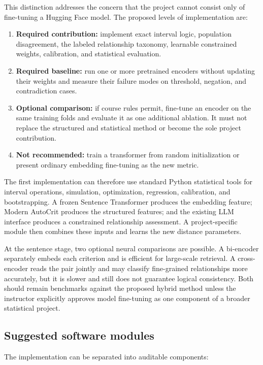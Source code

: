\documentclass[11pt]{article}
\begin{document}
This distinction addresses the concern that the project cannot consist only of fine-tuning a Hugging Face model. The proposed levels of implementation are:

\begin{enumerate}
    \item \textbf{Required contribution:} implement exact interval logic, population disagreement, the labeled relationship taxonomy, learnable constrained weights, calibration, and statistical evaluation.
    \item \textbf{Required baseline:} run one or more pretrained encoders without updating their weights and measure their failure modes on threshold, negation, and contradiction cases.
    \item \textbf{Optional comparison:} if course rules permit, fine-tune an encoder on the same training folds and evaluate it as one additional ablation. It must not replace the structured and statistical method or become the sole project contribution.
    \item \textbf{Not recommended:} train a transformer from random initialization or present ordinary embedding fine-tuning as the new metric.
\end{enumerate}

The first implementation can therefore use standard Python statistical tools for interval operations, simulation, optimization, regression, calibration, and bootstrapping. A frozen Sentence Transformer produces the embedding feature; Modern AutoCrit produces the structured features; and the existing LLM interface produces a constrained relationship assessment. A project-specific module then combines these inputs and learns the new distance parameters.

At the sentence stage, two optional neural comparisons are possible. A bi-encoder separately embeds each criterion and is efficient for large-scale retrieval. A cross-encoder reads the pair jointly and may classify fine-grained relationships more accurately, but it is slower and still does not guarantee logical consistency. Both should remain benchmarks against the proposed hybrid method unless the instructor explicitly approves model fine-tuning as one component of a broader statistical project.

\subsection{Suggested software modules}

The implementation can be separated into auditable components:
\end{document}
